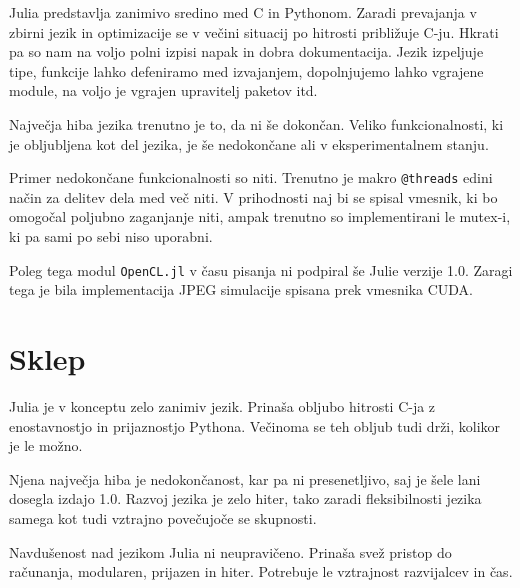 \documentclass[journal,a4paper,twoside]{sty/IEEEtran}
\begin{document}
Julia predstavlja zanimivo sredino med C in Pythonom.
Zaradi prevajanja v zbirni jezik in optimizacije se v večini situacij po hitrosti približuje C-ju.
Hkrati pa so nam na voljo polni izpisi napak in dobra dokumentacija.
Jezik izpeljuje tipe, funkcije lahko defeniramo med izvajanjem, dopolnjujemo lahko vgrajene module, na voljo je vgrajen upravitelj paketov itd.

Največja hiba jezika trenutno je to, da ni še dokončan.
Veliko funkcionalnosti, ki je obljubljena kot del jezika, je še nedokončane ali v eksperimentalnem stanju.

Primer nedokončane funkcionalnosti so niti.
Trenutno je makro \texttt{@threads} edini način za delitev dela med več niti.
V prihodnosti naj bi se spisal vmesnik, ki bo omogočal poljubno zaganjanje niti, ampak trenutno so implementirani le mutex-i, ki pa sami po sebi niso
	uporabni.

Poleg tega modul \texttt{OpenCL.jl} v času pisanja ni podpiral še Julie verzije 1.0.
Zaragi tega je bila implementacija JPEG simulacije spisana prek vmesnika CUDA.

\section{Sklep}

Julia je v konceptu zelo zanimiv jezik.
Prinaša obljubo hitrosti C-ja z enostavnostjo in prijaznostjo Pythona.
Večinoma se teh obljub tudi drži, kolikor je le možno.

Njena največja hiba je nedokončanost, kar pa ni presenetljivo, saj je šele lani dosegla izdajo 1.0.
Razvoj jezika je zelo hiter, tako zaradi fleksibilnosti jezika samega kot tudi vztrajno povečujoče se skupnosti.

Navdušenost nad jezikom Julia ni neupravičeno.
Prinaša svež pristop do računanja, modularen, prijazen in hiter.
Potrebuje le vztrajnost razvijalcev in čas.
\end{document}

